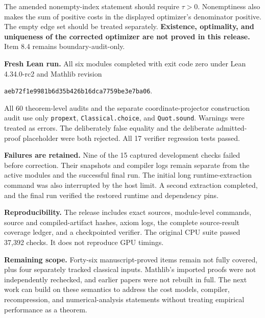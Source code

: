 \documentclass[11pt]{article}
\newcommand{\code}[1]{\texttt{\small #1}}
\begin{document}
The amended nonempty-index statement should require $\tau>0$. Nonemptiness also makes the sum of positive costs in the displayed optimizer's denominator positive. The empty edge set should be treated separately. \textbf{Existence, optimality, and uniqueness of the corrected optimizer are not proved in this release.} Item 8.4 remains boundary-audit-only.

\textbf{Fresh Lean run.} All six modules completed with exit code zero under Lean 4.34.0-rc2 and Mathlib revision
\begin{center}\code{aeb72f1e9981b6d35b426b16dca7759be3e7ba06}.
\end{center}
All 60 theorem-level audits and the separate coordinate-projector construction audit use only \code{propext}, \code{Classical.choice}, and \code{Quot.sound}. Warnings were treated as errors. The deliberately false equality and the deliberate admitted-proof placeholder were both rejected. All 17 verifier regression tests passed.

\textbf{Failures are retained.} Nine of the 15 captured development checks failed before correction. Their snapshots and compiler logs remain separate from the active modules and the successful final run. The initial long runtime-extraction command was also interrupted by the host limit. A second extraction completed, and the final run verified the restored runtime and dependency pins.

\textbf{Reproducibility.} The release includes exact sources, module-level commands, source and compiled-artifact hashes, axiom logs, the complete source-result coverage ledger, and a checkpointed verifier. The original CPU suite passed 37,392 checks. It does not reproduce GPU timings.

\textbf{Remaining scope.} Forty-six manuscript-proved items remain not fully covered, plus four separately tracked classical inputs. Mathlib's imported proofs were not independently rechecked, and earlier papers were not rebuilt in full. The next work can build on these semantics to address the cost models, compiler, recompression, and numerical-analysis statements without treating empirical performance as a theorem.
\end{document}
